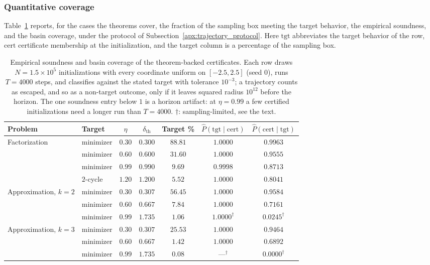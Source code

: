 \documentclass{article}
\begin{document}
\subsubsection{Quantitative coverage}
\label{apx:coverage_table}

Table~\ref{tab:matrix_coverage} reports, for the cases the theorems cover, the
fraction of the sampling box meeting the target behavior, the empirical
soundness, and the basin coverage, under the protocol of
Subsection~\ref{apx:trajectory_protocol}. Here $\mathrm{tgt}$ abbreviates the
target behavior of the row, $\mathrm{cert}$ certificate membership at the
initialization, and the target column is a percentage of the sampling box.

\begin{table}[t]
    \centering
    \caption{Empirical soundness and basin coverage of the theorem-backed
    certificates. Each row draws $N=1.5\times10^5$ initializations with every
    coordinate uniform on $[-2.5,2.5]$ (seed $0$), runs $T=4000$ steps, and
    classifies against the stated target with tolerance $10^{-3}$; a trajectory
    counts as escaped, and so as a non-target outcome, only if it leaves
    squared radius $10^{12}$ before the horizon. The one soundness entry below
    $1$ is a horizon artifact: at $\eta=0.99$ a few certified initializations
    need a longer run than $T=4000$. $\dagger$: sampling-limited, see the
    text.}
    \label{tab:matrix_coverage}
    \small
    \begin{tabular}{llccccc}
        \toprule
        Problem & Target & $\eta$ & $\delta_{\mathrm{th}}$
        & Target \%
        & $\widehat P(\text{tgt}\mid\text{cert})$
        & $\widehat P(\text{cert}\mid\text{tgt})$ \\
        \midrule
        Factorization & minimizer & $0.30$ & $0.300$ & $88.81$ & $1.0000$ & $0.9963$ \\
                      & minimizer & $0.60$ & $0.600$ & $31.60$ & $1.0000$ & $0.9555$ \\
                      & minimizer & $0.99$ & $0.990$ & $9.69$  & $0.9998$ & $0.8713$ \\
                      & $2$-cycle & $1.20$ & $1.200$ & $5.52$ & $1.0000$ & $0.8041$ \\
        \midrule
        Approximation, $k=2$ & minimizer & $0.30$ & $0.307$ & $56.45$ & $1.0000$ & $0.9584$ \\
                             & minimizer & $0.60$ & $0.667$ & $7.84$  & $1.0000$ & $0.7161$ \\
                             & minimizer & $0.99$ & $1.735$ & $1.06$  & $1.0000^\dagger$ & $0.0245^\dagger$ \\
        \midrule
        Approximation, $k=3$ & minimizer & $0.30$ & $0.307$ & $25.53$ & $1.0000$ & $0.9464$ \\
                             & minimizer & $0.60$ & $0.667$ & $1.42$  & $1.0000$ & $0.6892$ \\
                             & minimizer & $0.99$ & $1.735$ & $0.08$  & ---$^\dagger$ & $0.0000^\dagger$ \\
        \bottomrule
    \end{tabular}
\end{table}
\end{document}
